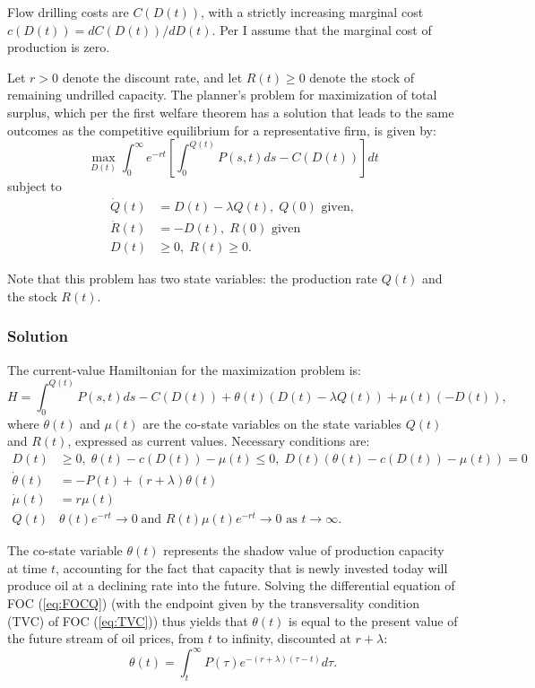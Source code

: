 \documentclass[12pt]{article}
\begin{document}
Flow drilling costs are $C(D(t))$, with a strictly increasing marginal cost $c(D(t))=dC(D(t))/dD(t)$. Per \cite{aks2018} I assume that the marginal cost of production is zero.

Let $r>0$ denote the discount rate, and let $R(t)\geq0$ denote the stock of remaining undrilled capacity. The planner's problem for maximization of total surplus, which per the first welfare theorem has a solution that leads to the same outcomes as the competitive equilibrium for a representative firm, is given by:
\begin{equation}
\max_{D(t)} \int_0^\infty e^{-rt} \left[\int_0^{Q(t)}P(s,t)ds - C(D(t)) \right] dt \label{eq:maximand}
\end{equation}
subject to
\begin{align}
\dot{Q}(t) &= D(t) - \lambda Q(t), \; Q(0) \text{ given}, \label{eq:Qdot} \\
\dot{R}(t) &= -D(t) \label{eq:Rdot}, \; R(0) \text{ given} \\
D(t) &\geq 0, \; R(t) \geq 0. \label{eq:Dconstraint}
\end{align}

\noindent Note that this problem has two state variables: the production rate $Q(t)$ and the stock $R(t)$.


\subsubsection{Solution}

The current-value Hamiltonian for the maximization problem is:
\begin{equation}
H = \int_0^{Q(t)}P(s,t)ds - C(D(t)) + \theta(t)(D(t) - \lambda Q(t)) + \mu(t)(-D(t)), \label{eq:hamiltonian}
\end{equation}
where $\theta(t)$ and $\mu(t)$ are the co-state variables on the state variables $Q(t)$ and $R(t)$, expressed as current values. Necessary conditions are:
\begin{align}
D(t) &\geq 0, \; \theta(t) - c(D(t)) - \mu(t)  \leq 0, \; D(t)(\theta(t) - c(D(t)) - \mu(t))=0  \label{eq:FOCD} \\
\dot{\theta}(t) &= -P(t) + (r+\lambda)\theta(t) \label{eq:FOCQ} \\
\dot{\mu}(t) &= r\mu(t) \label{eq:FOCR} \\
Q(t)&\theta(t)e^{-rt} \to 0 \; \text{and } R(t)\mu(t)e^{-rt} \to 0 \mbox{ as } t \to \infty. \label{eq:TVC}
\end{align}	

The co-state variable $\theta(t)$ represents the shadow value of production capacity at time $t$, accounting for the fact that capacity that is newly invested today will produce oil at a declining rate into the future. Solving the differential equation of FOC (\ref{eq:FOCQ}) (with the endpoint given by the transversality condition (TVC) of FOC (\ref{eq:TVC})) thus yields that $\theta(t)$ is equal to the present value of the future stream of oil prices, from $t$ to infinity, discounted at $r+\lambda$:
\begin{equation}
\theta(t) = \int_{t}^{\infty}P(\tau) e^{-(r+\lambda)(\tau-t)}d\tau.
\label{eq:theta}
\end{equation}
\end{document}
